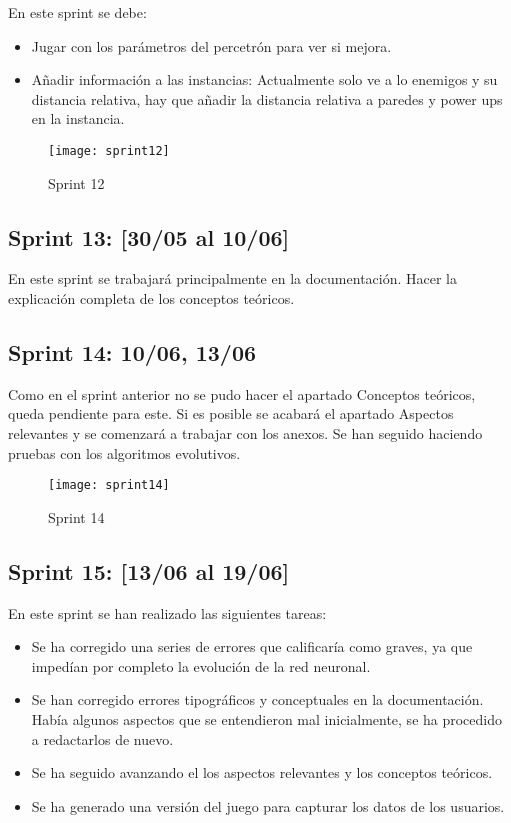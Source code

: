 En este sprint se debe:
\begin{itemize}
    \item Jugar con los parámetros del percetrón para ver si mejora.
    \item Añadir información a las instancias: Actualmente solo ve a lo enemigos y su distancia relativa, hay que añadir la distancia relativa a paredes y power ups en la instancia. 
\end{itemize}

\begin{figure}[h!]
    \centering
    \texttt{[image: sprint12]}
    \caption{Sprint 12}
    \label{fig:s12}
\end{figure}

\subsection{Sprint 13: [30/05 al 10/06]}

En este sprint se trabajará principalmente en la documentación. Hacer la explicación completa de los conceptos teóricos.


\subsection{Sprint 14:  10/06, 13/06}

Como en el sprint anterior no se pudo hacer el apartado Conceptos teóricos, queda pendiente para este. Si es posible se acabará el apartado Aspectos relevantes y se comenzará a trabajar con los anexos. Se han seguido haciendo pruebas con los algoritmos evolutivos.

\begin{figure}[h!]
    \centering
    \texttt{[image: sprint14]}
    \caption{Sprint 14}
    \label{fig:s14}
\end{figure}

\subsection{Sprint 15: [13/06 al 19/06]}

En este sprint se han realizado las siguientes tareas: 
\begin{itemize}
    \item Se ha corregido una series de errores que calificaría como graves, ya que impedían por completo la evolución de la red neuronal.
    \item Se han corregido errores tipográficos y conceptuales en la documentación. Había algunos aspectos que se entendieron mal inicialmente, se ha procedido a redactarlos de nuevo.
    \item Se ha seguido avanzando el los aspectos relevantes y los conceptos teóricos.
    \item Se ha generado una versión del juego para capturar los datos de los usuarios.
\end{itemize}

